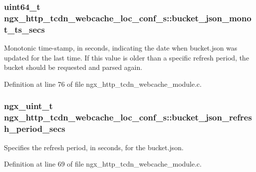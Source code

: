 \subsubsection[{\texorpdfstring{bucket\+\_\+json\+\_\+monot\+\_\+ts\+\_\+secs}{bucket_json_monot_ts_secs}}]{\setlength{\rightskip}{0pt plus 5cm}uint64\+\_\+t ngx\+\_\+http\+\_\+tcdn\+\_\+webcache\+\_\+loc\+\_\+conf\+\_\+s\+::bucket\+\_\+json\+\_\+monot\+\_\+ts\+\_\+secs}\hypertarget{structngx__http__tcdn__webcache__loc__conf__s_a3ea999ac7a3d6d325d3101658677706c}{}\label{structngx__http__tcdn__webcache__loc__conf__s_a3ea999ac7a3d6d325d3101658677706c}
Monotonic time-\/stamp, in seconds, indicating the date when \textquotesingle{}bucket.\+json\textquotesingle{} was updated for the last time. If this value is older than a specific refresh period, the bucket should be requested and parsed again. 

Definition at line 76 of file ngx\+\_\+http\+\_\+tcdn\+\_\+webcache\+\_\+module.\+c.

\subsubsection[{\texorpdfstring{bucket\+\_\+json\+\_\+refresh\+\_\+period\+\_\+secs}{bucket_json_refresh_period_secs}}]{\setlength{\rightskip}{0pt plus 5cm}ngx\+\_\+uint\+\_\+t ngx\+\_\+http\+\_\+tcdn\+\_\+webcache\+\_\+loc\+\_\+conf\+\_\+s\+::bucket\+\_\+json\+\_\+refresh\+\_\+period\+\_\+secs}\hypertarget{structngx__http__tcdn__webcache__loc__conf__s_a9730c60ca294166a96154e7ada19a3ec}{}\label{structngx__http__tcdn__webcache__loc__conf__s_a9730c60ca294166a96154e7ada19a3ec}
Specifies the refresh period, in seconds, for the \textquotesingle{}bucket.\+json\textquotesingle{}. 

Definition at line 69 of file ngx\+\_\+http\+\_\+tcdn\+\_\+webcache\+\_\+module.\+c.

